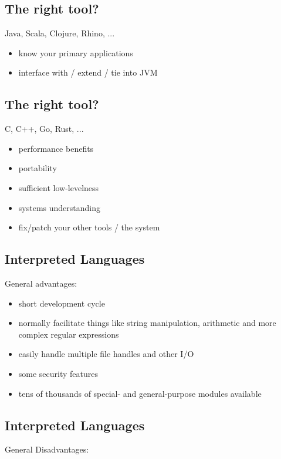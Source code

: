 \documentclass[xga]{xdvislides}
\begin{document}
\subsection{The right tool?}
Java, Scala, Clojure, Rhino, ... \\

\begin{itemize}
	\item know your primary applications
	\item interface with / extend / tie into JVM
\end{itemize}

\subsection{The right tool?}
C, C++, Go, Rust, ... \\

\begin{itemize}
	\item performance benefits
	\item portability
	\item sufficient low-levelness
	\item systems understanding
	\item fix/patch your other tools / the system
\end{itemize}

\subsection{Interpreted Languages}
General advantages: \\

\begin{itemize}
	\item short development cycle
	\item normally facilitate things like string manipulation, arithmetic and
		more complex regular expressions
	\item easily handle multiple file handles and other I/O
	\item some security features
	\item tens of thousands of special- and general-purpose modules available
\end{itemize}

\subsection{Interpreted Languages}
General Disadvantages: \\
\end{document}
